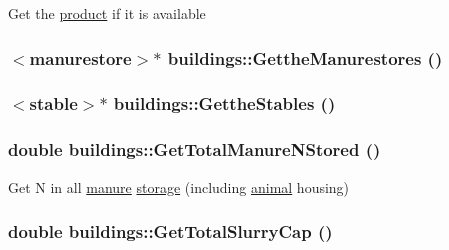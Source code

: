 \label{classbuildings_a9b71637ed71eb2f332c3f56d774f2f6a}
Get the \hyperlink{classproduct}{product} if it is available \hypertarget{classbuildings_a80de7e67dd8e3ff545151ee8a01171d4}{
\subsubsection[{GettheManurestores}]{$<${\bf manurestore}$>$$\ast$ buildings::GettheManurestores ()}}
\label{classbuildings_a80de7e67dd8e3ff545151ee8a01171d4}
\hypertarget{classbuildings_ae1d964dd1eea984f929442218a6ca587}{
\subsubsection[{GettheStables}]{$<${\bf stable}$>$$\ast$ buildings::GettheStables ()}}
\label{classbuildings_ae1d964dd1eea984f929442218a6ca587}
\hypertarget{classbuildings_a07a1880ab85c57d783b1fc5582e767de}{
\subsubsection[{GetTotalManureNStored}]{\setlength{\rightskip}{0pt plus 5cm}double buildings::GetTotalManureNStored ()}}
\label{classbuildings_a07a1880ab85c57d783b1fc5582e767de}
Get N in all \hyperlink{classmanure}{manure} \hyperlink{classstorage}{storage} (including \hyperlink{classanimal}{animal} housing) \hypertarget{classbuildings_a01997e6fff4a33f76068f49dd064582f}{
\subsubsection[{GetTotalSlurryCap}]{\setlength{\rightskip}{0pt plus 5cm}double buildings::GetTotalSlurryCap ()}}
\label{classbuildings_a01997e6fff4a33f76068f49dd064582f}
